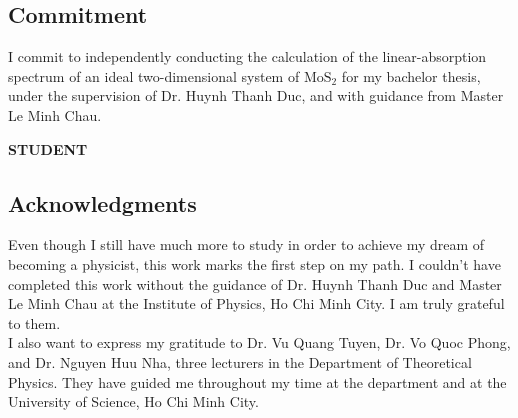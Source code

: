 \documentclass[12pt,english,a4paper]{article}
\begin{document}
%			
%			
%			
%			
%			
%			
	\newpage
	\begin{center}
		
		\section*{Commitment}
	\end{center}
	I commit to independently conducting the calculation of the linear-absorption spectrum of an ideal two-dimensional system of $\mathrm{MoS}_2$ for my bachelor thesis, under  the supervision of Dr. Huynh Thanh Duc, and with guidance from Master Le Minh Chau.\\[2cm]
\parbox{0.75in}{\centering \textbf{}} \hfill \parbox{2.5in}{\centering \textbf{STUDENT}}
	\newpage
	\begin{center}
		\section*{Acknowledgments}
	\end{center}
	\quad Even though I still have much more to study in order to achieve my dream of becoming a physicist, this work marks the first step on my path. I couldn't have completed this work without the guidance of Dr. Huynh Thanh Duc and Master Le Minh Chau at the Institute of Physics, Ho Chi Minh City. I am truly grateful to them.\\\null
	\quad I also want to express my gratitude to Dr. Vu Quang Tuyen, Dr. Vo Quoc Phong, and Dr. Nguyen Huu Nha, three lecturers in the Department of Theoretical Physics. They have guided me throughout my time at the department and at the University of Science, Ho Chi Minh City.
\end{document}
